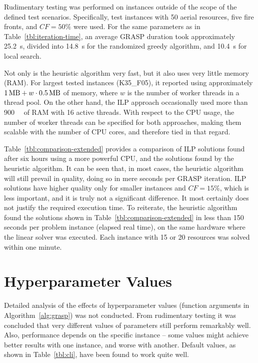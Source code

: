 Rudimentary testing was performed on instances outside of the scope of the defined test scenarios.
Specifically, test instances with 50 aerial resources, five fire fronts, and $\mathit{CF} = 50\%$ were used.
For the same parameters as in Table~\ref{tbl:iteration-time}, an average GRASP duration took approximately \SI{25.2}{\second}, divided into \SI{14.8}{\second} for the randomized greedy algorithm, and \SI{10.4}{\second} for local search.

Not only is the heuristic algorithm very fast, but it also uses very little memory (RAM).
For largest tested instances (K35\_F05), it reported using approximately $\SI{1}{\mega\byte} + w \cdot \SI{0.5}{\mega\byte}$ of memory, where $w$ is the number of worker threads in a thread pool.
On the other hand, the ILP approach occasionally used more than \SI{900}{\mega\byte} of RAM with 16 active threads.
With respect to the CPU usage, the number of worker threads can be specified for both approaches, making them scalable with the number of CPU cores, and therefore tied in that regard.

Table~\ref{tbl:comparison-extended} provides a comparison of ILP solutions found after six hours using a more powerful CPU, and the solutions found by the heuristic algorithm.
It can be seen that, in most cases, the heuristic algorithm will still prevail in quality, doing so in mere seconds per GRASP iteration.
ILP solutions have higher quality only for smaller instances and $\mathit{CF} = 15\%$, which is less important, and it is truly not a significant difference.
It most certainly does not justify the required execution time.
To reiterate, the heuristic algorithm found the solutions shown in Table~\ref{tbl:comparison-extended} in less than 150 seconds per problem instance (elapsed real time), on the same hardware where the linear solver was executed.
Each instance with 15 or 20 resources was solved within one minute.


\section{Hyperparameter Values}

Detailed analysis of the effects of hyperparameter values (function arguments in Algorithm~\ref{alg:grasp}) was not conducted.
From rudimentary testing it was concluded that very different values of parameters still perform remarkably well.
Also, performance depends on the specific instance -- some values might achieve better results with one instance, and worse with another.
Default values, as shown in Table~\ref{tbl:cli}, have been found to work quite well.

